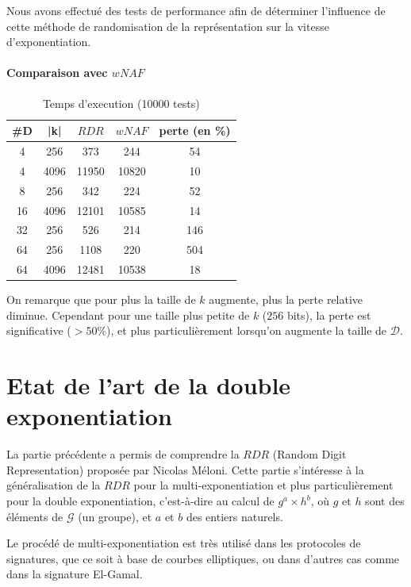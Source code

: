 \documentclass[12pt, a4paper]{memoir}
\begin{document}
Nous avons effectué des tests de performance afin de déterminer l'influence de cette méthode de randomisation de la représentation sur la vitesse d'exponentiation.

\subsubsection{Comparaison avec $wNAF$}

\begin{table}[htbp]
\caption{Temps d'execution (10000 tests) }
\begin{center}
\begin{tabular}{ccccc}
\toprule
\#D & |k| & $RDR$ & $wNAF$ & perte (en \%) \\
\midrule
4 & 256 & 373  & 244 & 54\\
4 & 4096 & 11950 & 10820 & 10 \\
8 & 256 & 342 & 224 & 52 \\
16 & 4096 & 12101 & 10585 & 14 \\
32 & 256 & 526 & 214 & 146 \\
64 & 256 & 1108 & 220 & 504 \\
64 & 4096 & 12481 & 10538 & 18 \\
\bottomrule
\end{tabular}
\end{center}
\label{tab:example}
\end{table}%

On remarque que pour plus la taille de $k$ augmente, plus la perte relative diminue.
Cependant pour une taille plus petite de $k$ ($256$ bits), la perte est significative ($> 50 \%$),
et plus particulièrement lorsqu'on augmente la taille de $\mathcal{D}$.

\chapter{Etat de l'art de la double exponentiation}

La partie précédente a permis de comprendre la $RDR$ (Random Digit Representation) proposée par Nicolas Méloni.
Cette partie s'intéresse à la généralisation de la $RDR$ pour la multi-exponentiation et plus particulièrement
pour la double exponentiation, c'est-à-dire au calcul de $g^a \times h^b$, où $g$ et $h$ sont des 
éléments de $\mathcal{G}$ (un groupe), et $a$ et $b$ des entiers naturels.

Le procédé de multi-exponentiation est très utilisé dans les protocoles de signatures, que ce soit à base 
de courbes elliptiques, ou dans d'autres cas comme dans la signature El-Gamal.
\end{document}
